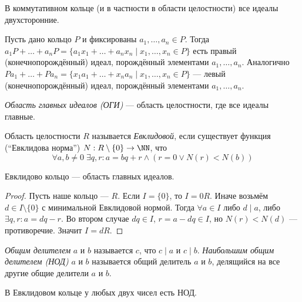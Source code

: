 \documentclass[12pt,a4paper]{article}
\begin{document}
    \begin{remark}
        В коммутативном кольце (и в частности в области целостности) все идеалы двухсторонние.
    \end{remark}

    \begin{example}
        Пусть дано кольцо $P$ и фиксированы $a_1, \dots, a_n \in P$. Тогда $a_1 P + \dots + a_n P = \{a_1 x_1 + \dots + a_n x_n \mid x_1, \dots, x_n \in P\}$ есть правый (конечнопорождённый) идеал, порождённый элементами $a_1, \dots, a_n$. Аналогично $P a_1 + \dots + P a_n = \{x_1 a_1 + \dots + x_n a_n \mid x_1, \dots, x_n \in P\}$ --- левый (конечнопорождённый) идеал, порождённый элементами $a_1, \dots, a_n$.
    \end{example}

    \begin{definition}
        \emph{Область главных идеалов (ОГИ)} --- область целостности, где все идеалы главные.
    \end{definition}

    \begin{definition}
        Область целостности $R$ называется \emph{Евклидовой}, если существует функция (``Евклидова норма'') $N: R\setminus\{0\} \to \NN$, что
        \[\forall a, b \neq 0\; \exists q, r: a = bq + r \wedge (r = 0 \vee N(r) < N(b))\]
    \end{definition}

    \begin{theorem}
        Евклидово кольцо --- область главных идеалов.
    \end{theorem}

    \begin{proof}
        Пусть наше кольцо --- $R$. Если $I = \{0\}$, то $I = 0R$. Иначе возьмём $d \in I \setminus \{0\}$ с минимальной Евклидовой нормой. Тогда $\forall a \in I$ либо $d \mid a$, либо $\exists q, r: a = dq - r$. Во втором случае $dq \in I$, $r = a - dq \in I$, но $N(r) < N(d)$ --- противоречие. Значит $I = dR$.
    \end{proof}

    \begin{definition}
        \emph{Общим делителем} $a$ и $b$ называется $c$, что $c \mid a$ и $c \mid b$. \emph{Наибольшим общим делителем (НОД)} $a$ и $b$ называется общий делитель $a$ и $b$, делящийся на все другие общие делители $a$ и $b$.
    \end{definition}

    \begin{theorem}
        В Евклидовом кольце у любых двух чисел есть НОД.
    \end{theorem}
\end{document}
